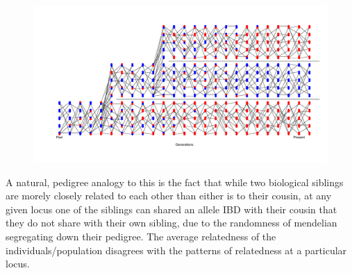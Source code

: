 \begin{figure}
\begin{center}
\includegraphics[width=\textwidth]{figures/Genetic_drift/ILS/ILS.pdf}
\end{center}
\caption{  } \label{fig:ILS_poly} 
\end{figure}

A natural, pedigree analogy to this is the fact that while two
biological siblings are morely closely related to each other than
either is to their cousin, at any given locus one of the siblings can
shared an allele IBD with their cousin that they do not share with
their own sibling, due to the randomness of mendelian segregating down their
pedigree. The average relatedness of the individuals/population disagrees
with the patterns of relatedness at a particular locus.

